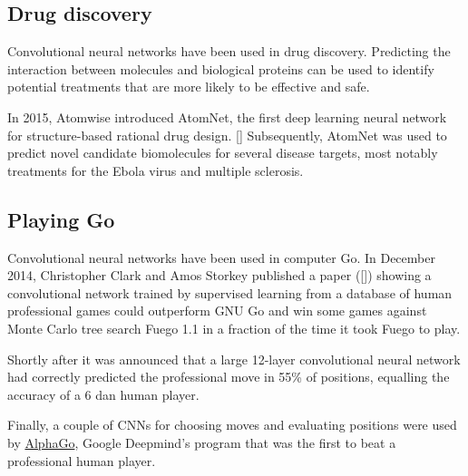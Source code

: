 \subsection{Drug discovery}

Convolutional neural networks have been used in drug discovery. Predicting the interaction between molecules and biological proteins can be used to identify potential treatments that are more likely to be effective and safe.

In 2015, Atomwise introduced AtomNet, the first deep learning neural network for structure-based rational drug design. [\cite{DBLP:journals/corr/WallachDH15}]
Subsequently, AtomNet was used to predict novel candidate biomolecules for several disease targets, most notably treatments for the Ebola virus and multiple sclerosis.

\subsection{Playing Go}

Convolutional neural networks have been used in computer Go. In December 2014, Christopher Clark and Amos Storkey published a paper ([\cite{DBLP:journals/corr/ClarkS14}]) showing a convolutional network trained by supervised learning from a database of human professional games could outperform GNU Go and win some games against Monte Carlo tree search Fuego 1.1 in a fraction of the time it took Fuego to play.

Shortly after it was announced that a large 12-layer convolutional neural network had correctly predicted the professional move in 55\% of positions, equalling the accuracy of a 6 dan human player.

Finally, a couple of \acp{CNN} for choosing moves and evaluating positions were used by \href{https://deepmind.com/research/alphago/}{AlphaGo}, Google Deepmind's program that was the first to beat a professional human player.